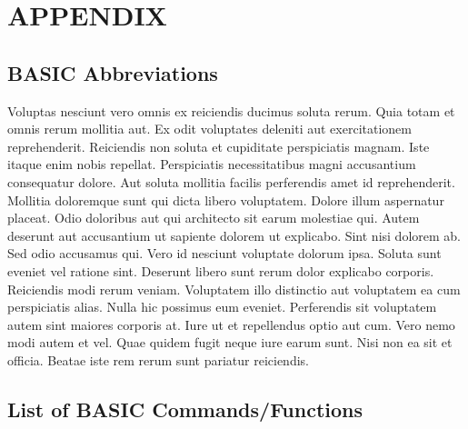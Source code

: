 \documentclass[
	11pt, %
	fleqn, %
	letterpaper, %
]{CommodoreBlueBook}
\begin{document}
\cleardoublepage



\cleardoublepage

\makeatletter\@openrightfalse
\part{APPENDIX}

\chapter*{BASIC Abbreviations}

Voluptas nesciunt vero omnis ex reiciendis ducimus soluta rerum. Quia totam et
omnis rerum mollitia aut. Ex odit voluptates deleniti aut exercitationem
reprehenderit. Reiciendis non soluta et cupiditate perspiciatis magnam. Iste
itaque enim nobis repellat. Perspiciatis necessitatibus magni accusantium
consequatur dolore. Aut soluta mollitia facilis perferendis amet id
reprehenderit. Mollitia doloremque sunt qui dicta libero voluptatem. Dolore
illum aspernatur placeat. Odio doloribus aut qui architecto sit earum molestiae
qui. Autem deserunt aut accusantium ut sapiente dolorem ut explicabo. Sint nisi
dolorem ab. Sed odio accusamus qui. Vero id nesciunt voluptate dolorum ipsa.
Soluta sunt eveniet vel ratione sint. Deserunt libero sunt rerum dolor
explicabo corporis. Reiciendis modi rerum veniam. Voluptatem illo distinctio
aut voluptatem ea cum perspiciatis alias. Nulla hic possimus eum eveniet.
Perferendis sit voluptatem autem sint maiores corporis at. Iure ut et
repellendus optio aut cum. Vero nemo modi autem et vel. Quae quidem fugit neque
iure earum sunt. Nisi non ea sit et officia. Beatae iste rem rerum sunt
pariatur reiciendis.

\chapter*{List of BASIC Commands/Functions}
\end{document}

